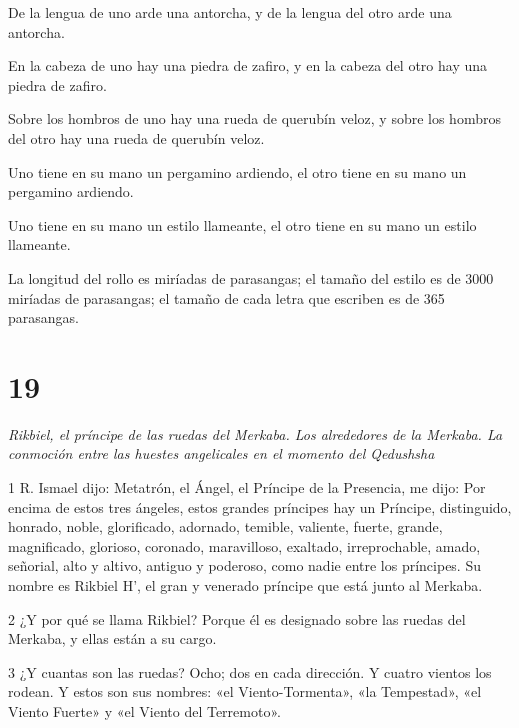 \par De la lengua de uno arde una antorcha, y de la lengua del otro arde una antorcha.

\par En la cabeza de uno hay una piedra de zafiro, y en la cabeza del otro hay una piedra de zafiro.

\par Sobre los hombros de uno hay una rueda de querubín veloz, y sobre los hombros del otro hay una rueda de querubín veloz.

\par Uno tiene en su mano un pergamino ardiendo, el otro tiene en su mano un pergamino ardiendo.

\par Uno tiene en su mano un estilo llameante, el otro tiene en su mano un estilo llameante.

\par La longitud del rollo es miríadas de parasangas; el tamaño del estilo es de 3000 miríadas de parasangas; el tamaño de cada letra que escriben es de 365 parasangas.

\chapter{19}

\par \textit{Rikbiel, el príncipe de las ruedas del Merkaba. Los alrededores de la Merkaba. La conmoción entre las huestes angelicales en el momento del Qedushsha}

\par 1 R. Ismael dijo: Metatrón, el Ángel, el Príncipe de la Presencia, me dijo: Por encima de estos tres ángeles, estos grandes príncipes hay un Príncipe, distinguido, honrado, noble, glorificado, adornado, temible, valiente, fuerte, grande, magnificado, glorioso, coronado, maravilloso, exaltado, irreprochable, amado, señorial, alto y altivo, antiguo y poderoso, como nadie entre los príncipes. Su nombre es Rikbiel H', el gran y venerado príncipe que está junto al Merkaba.

\par 2 ¿Y por qué se llama Rikbiel? Porque él es designado sobre las ruedas del Merkaba, y ellas están a su cargo.

\par 3 ¿Y cuantas son las ruedas? Ocho; dos en cada dirección. Y cuatro vientos los rodean. Y estos son sus nombres: «el Viento-Tormenta», «la Tempestad», «el Viento Fuerte» y «el Viento del Terremoto».

